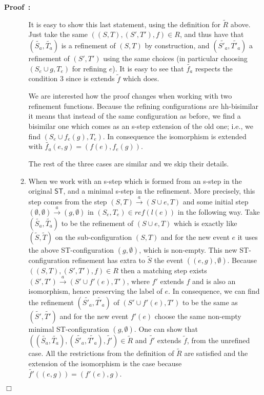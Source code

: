 \documentclass[submission,copyright,creativecommons]{eptcs}
\newenvironment{proof}[1][\!\!\,]{\vspace{1ex}\noindent\textbf{Proof #1: }}{\hfill$\Box$\vspace{2ex}}
\newcounter{case}
\newcommand\ST{\ensuremath{\mathsf{ST}}}
\newcommand\reffun{\ensuremath{\mathit{ref}}}
\newcommand\refinement[1]{\ensuremath{\widetilde{#1}}}
\newcommand{\transition}[1]{\ensuremath{\xrightarrow{#1}}}
\begin{document}
\begin{proof}
\begin{enumerate}
\begin{enumerate}
It is easy to show this last statement, using the definition for $\refinement{R}$ above. Just take the same $((S,T),(S',T'),f)\in R$, and thus have that $(\refinement{S_{a}},\refinement{T_{a}})$ is a refinement of $(S,T)$ by construction, and $(\refinement{S'_{a}},\refinement{T'_{a}})$ a refinement of $(S',T')$ using the same choices (in particular choosing $(S_{e}\cup g,T_{e})$ for refining $e$). It is easy to see that $\refinement{f_{a}}$ respects the condition 3 since is extends $\refinement{f}$ which does.

\vspace{1ex}We are interested how the proof changes when working with two refinement functions. Because the refining configurations are hh-bisimilar it means that instead of the same configuration as before, we find a bisimilar one which comes as an s-step extension of the old one; i.e., we find $(S_{e}\cup f_{e}(g),T_{e})$. In consequence the isomorphism is extended with $\refinement{f_{a}}(e,g)=(f(e),f_{e}(g))$.

\vspace{1ex}The rest of the three cases are similar and we skip their details.\vspace{1ex}

\item When we work with an s-step which is formed from an s-step in the original \ST, and a minimal s-step in the refinement.
More precisely, this step comes from the step $(S,T)\transition{a}(S\cup e,T)$ and some initial step $(\emptyset,\emptyset)\transition{a}(g,\emptyset)$ in $(S_{e},T_{e})\in\reffun(l(e))$ in the following way. Take $(\refinement{S_{a}},\refinement{T_{a}})$ to be the refinement of $(S\cup e,T)$ which is exactly like $(\refinement{S},\refinement{T})$ on the sub-configuration $(S,T)$ and for the new event $e$ it uses the above ST-configuration $(g,\emptyset)$, which is non-empty. This new ST-configuration refinement has extra to $\refinement{S}$ the event $((e,g),\emptyset)$.
Because $((S,T),(S',T'),f)\in R$ then a matching step exists  $(S',T')\transition{a}(S'\cup f'(e),T')$, where $f'$ extends $f$ and is also an isomorphism, hence preserving the label of $e$.
In consequence, we can find the refinement $(\refinement{S'_{a}},\refinement{T'_{a}})$ of $(S'\cup f'(e),T')$ to be the same as $(\refinement{S'},\refinement{T'})$ and for the new event $f'(e)$ choose the same non-empty minimal ST-configuration $(g,\emptyset)$.
One can show that $((\refinement{S_{a}},\refinement{T_{a}}),(\refinement{S'_{a}},\refinement{T'_{a}}),\refinement{f'})\in\refinement{R}$ and $\refinement{f'}$ extends $\refinement{f}$, from the unrefined case. All the restrictions from the definition of $\refinement{R}$ are satisfied and the extension of the isomorphism is the case because $\refinement{f'}((e,g))=(f'(e),g)$.


\end{enumerate}
\end{enumerate}
\end{proof}
\end{document}
